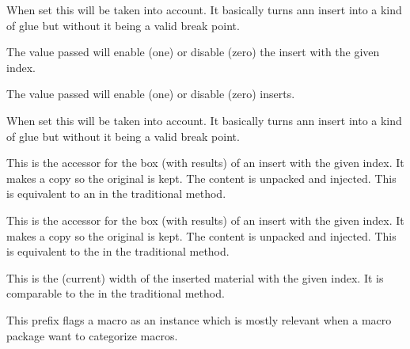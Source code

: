 \startnewprimitive[title={\prm {insertshrink}}]

When set this will be taken into account. It basically turns ann insert into a
kind of glue but without it being a valid break point.

\stopnewprimitive

\startnewprimitive[title={\prm {insertstorage}}]

The value passed will enable (one) or disable (zero) the insert with the given
index.

\stopnewprimitive

\startnewprimitive[title={\prm {insertstoring}}]

The value passed will enable (one) or disable (zero) inserts.

\stopnewprimitive

\startnewprimitive[title={\prm {insertstretch}}]

When set this will be taken into account. It basically turns ann insert into a
kind of glue but without it being a valid break point.

\stopnewprimitive

\startnewprimitive[title={\prm {insertunbox}}]

This is the accessor for the box (with results) of an insert with the given
index. It makes a copy so the original is kept. The content is unpacked and
injected. This is equivalent to an  in the traditional method.

\stopnewprimitive

\startnewprimitive[title={\prm {insertuncopy}}]

This is the accessor for the box (with results) of an insert with the given
index. It makes a copy so the original is kept. The content is unpacked and
injected. This is equivalent to the  in the traditional method.

\stopnewprimitive

\startnewprimitive[title={\prm {insertwidth}}]

This is the (current) width of the inserted material with the given index. It is
comparable to the  in the traditional method.

\stopnewprimitive

\startnewprimitive[title={\prm {instance}}]

This prefix flags a macro as an instance which is mostly relevant when a macro
package want to categorize macros.

\stopnewprimitive

